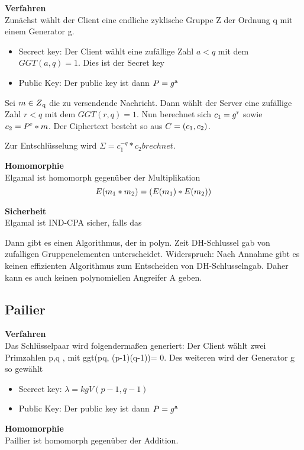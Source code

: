 \textbf{Verfahren}\\

Zunächst wählt der Client eine endliche zyklische Gruppe Z der Ordnung q mit einem Generator g.
\begin{itemize}	
	\item Secrect key: Der Client wählt eine zufällige Zahl $a<q$ mit dem $GGT(a,q) = 1$. Dies ist der Secret key
	\item Public Key: Der public key ist dann $P = g\textsuperscript{a} $	
\end{itemize}

Sei $m \in Z\textsubscript{q}$ die zu versendende Nachricht. Dann wählt der Server eine zufällige Zahl $r<q$ mit dem $GGT(r,q) = 1$. Nun berechnet sich $c\textsubscript{1} = g\textsuperscript{r}$ sowie $c\textsubscript{2} =P \textsuperscript{r} *m$. Der Ciphertext besteht so aus $C = (c\textsubscript{1},c\textsubscript{2})$.

Zur Entschlüsselung wird $\Sigma = c_{1}^{-q} * c_{2} brechnet.$

\textbf{Homomorphie}\\
Elgamal ist homomorph gegenüber der Multiplikation
$$ E(m \textsubscript{1} * m \textsubscript{2}) = (E(m \textsubscript{1}) * E(m \textsubscript{2}))$$

\textbf{Sicherheit}\\
Elgamal ist IND-CPA sicher, falls das



Dann gibt es einen Algorithmus, der in polyn. Zeit DH-Schlussel gab von zufalligen Gruppenelementen unterscheidet.
Widerspruch:
Nach Annahme gibt es keinen effizienten
Algorithmus zum Entscheiden von DH-Schlusselngab.
Daher kann es auch keinen polynomiellen Angreifer A geben.



\subsection{Pailier}
\label{sec:Sec1.3.2}

\textbf{Verfahren}\\
Das Schlüsselpaar wird folgendermaßen generiert:
Der Client wählt zwei Primzahlen p,q , mit ggt(pq, (p-1)(q-1))= 0. Des weiteren wird der Generator g so gewählt
\begin{itemize}	
	\item Secrect key: $ \lambda = kgV(p-1, q-1) $
	\item Public Key: Der public key ist dann $P = g\textsuperscript{a} $	
\end{itemize}
\textbf{Homomorphie}\\
Paillier ist homomorph gegenüber der Addition.


